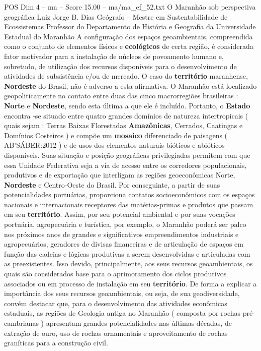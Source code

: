 \begin{textsample}{POS Dim 4 – ma – Score 15.00 – ma/ma\_ef\_52.txt}  \label{ex:f4_pos_054}
O Maranhão sob perspectiva geográfica Luiz Jorge B.
Dias Geógrafo – Mestre em Sustentabilidade de Ecossistemas Professor do Departamento de História e Geografia da Universidade Estadual do Maranhão A configuração dos espaços geoambientais, compreendida como o conjunto de elementos físicos e \textbf{ecológicos} de certa região, é considerada fator motivador para a instalação de núcleos de povoamento humano e, sobretudo, de utilização dos recursos disponíveis para o desenvolvimento de atividades de subsistência e/ou de mercado.
O caso do \textbf{território} maranhense, \textbf{Nordeste} do Brasil, não é adverso a esta afirmativa.
O Maranhão está localizado geopoliticamente no contato entre duas das cinco macrorregiões brasileiras : \textbf{Norte} e \textbf{Nordeste}, sendo esta última a que ele é incluído.
Portanto, o \textbf{Estado} encontra -se situado entre quatro grandes domínios de natureza intertropicais ( quais sejam : Terras Baixas Florestadas \textbf{Amazônicas}, Cerrados, Caatingas e Domínios Costeiros ) e compõe um \textbf{mosaico} diferenciado de paisagens ( AB’SÁBER:2012 ) e de usos dos elementos naturais bióticos e abióticos disponíveis.
Suas situação e posição geográficas privilegiadas permitem com que essa Unidade Federativa seja a via de acesso entre os corredores populacionais, produtivos e de exportação que interligam as regiões geoeconômicas Norte, \textbf{Nordeste} e Centro-Oeste do Brasil.
Por conseguinte, a partir de suas potencialidades portuárias, proporciona contatos socioeconômicos com os espaços nacionais e internacionais receptores das matérias-primas e produtos que passam em seu \textbf{território}.
Assim, por seu potencial ambiental e por suas vocações portuária, agropecuária e turística, por exemplo, o Maranhão poderá ser palco nos próximos anos de grandes e significativos empreendimentos industriais e agropecuários, geradores de divisas financeiras e de articulação de espaços em função das cadeias e lógicas produtivas a serem desenvolvidas e articuladas com as preexistentes.
Isso devido, principalmente, aos seus recursos geoambientais, os quais são considerados base para o aprimoramento dos ciclos produtivos associados ou em processo de instalação em seu \textbf{território}.
De forma a explicar a importância dos seus recursos geoambientais, ou seja, de sua geodiversidade, convém destacar que, para o desenvolvimento das atividades econômicas estaduais, as regiões de Geologia antiga no Maranhão ( composta por rochas pré-cambrianas ) apresentam grandes potencialidades nas últimas décadas, de extração de ouro, uso de rochas ornamentais e aproveitamento de rochas graníticas para a construção civil.

\end{textsample}
